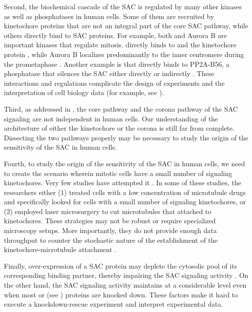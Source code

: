 Second, the biochemical cascade of the SAC is regulated by many other kinases as well as phosphatases in human cells. Some of them are recruited by kinetochore proteins that are not an integral part of the core SAC pathway, while others directly bind to SAC proteins. For example, both  and Aurora B are important kinases that regulate mitosis.  directly binds to  and the kinetochore protein  \cite{CENPU+BUB1-PLK1}, while Aurora B localizes predominantly to the inner centromere during the prometaphase \cite{BUB1_pH2A_AuroraB}. Another example is that  directly binds to PP2A-B56, a phosphatase that silences the SAC either directly \cite{PP2ADephosphorylatesKNL1, PP2ADephosphorylatesBUB1} or indirectly \cite{BUBR1_KT-MT, Suijkerbuijk2012, BUBR1-L669A+I672A, PP2A-B56-BUBR1ChromosomeCongression_Xu2013, PP2A-B56}. These interactions and regulations complicate the design of  experiments and the interpretation of cell biology data (for example, see ).

Third, as addressed in , the core pathway and the corona pathway of the SAC signaling are not independent in human cells. Our understanding of the architecture of either the kinetochore or the corona is still far from complete. Dissecting the two pathways properly may be necessary to study the origin of the sensitivity of the SAC in human cells.

Fourth, to study the origin of the sensitivity of the SAC in human cells, we need to create the scenario wherein mitotic cells have a small number of signaling kinetochores. Very few studies have attempted it \cite{RiederNormalProgression, Rheostat, Ablation}. In some of these studies, the researchers either (1) treated cells with a low concentration of microtubule drugs and specifically looked for cells with a small number of signaling kinetochores, or (2) employed laser microsurgery to cut microtubules that attached to kinetochores. These strategies may not be robust or require specialized microscopy setups. More importantly, they do not provide enough data throughput to counter the stochastic nature of the establishment of the kinetochore-microtubule attachment \cite{GradualStochastic}.

Finally, over-expression of a SAC protein may deplete the cytosolic pool of its corresponding binding partner, thereby impairing the SAC signaling activity \cite{Bub3Competition, FissionYeastSACRobustness, ATMPhosphorylatesMad1S214, MAD1Overexpression_Ryan2012}. On the other hand, the SAC signaling activity maintains at a considerable level even when most  \cite{Raaijmakers2018, RZZ-MAD1vsBUB1-MAD1_2018, siROD_Zhang2019} or  (see ) proteins are knocked down. These factors make it hard to execute a knockdown-rescue experiment and interpret experimental data.

